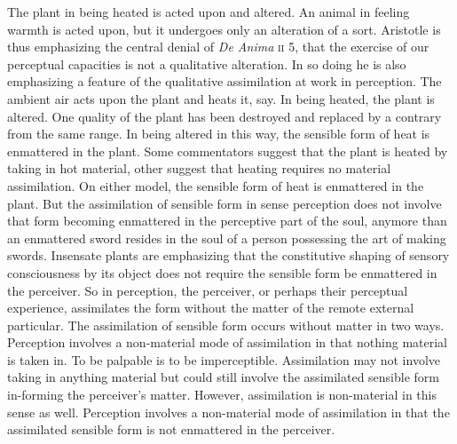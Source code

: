 The plant in being heated is acted upon and altered. An animal in feeling warmth is acted upon, but it undergoes only an alteration of a sort. Aristotle is thus emphasizing the central denial of \emph{De Anima} \textsc{ii} 5, that the exercise of our perceptual capacities is not a qualitative alteration. In so doing he is also emphasizing a feature of the qualitative assimilation at work in perception. The ambient air acts upon the plant and heats it, say. In being heated, the plant is altered. One quality of the plant has been destroyed and replaced by a contrary from the same range. In being altered in this way, the sensible form of heat is enmattered in the plant. Some commentators suggest that the plant is heated by taking in hot material, other suggest that heating requires no material assimilation. On either model, the sensible form of heat is enmattered in the plant. But the assimilation of sensible form in sense perception does not involve that form becoming enmattered in the perceptive part of the soul, anymore than an enmattered sword resides in the soul of a person possessing the art of making swords. Insensate plants are emphasizing that the constitutive shaping of sensory consciousness by its object does not require the sensible form be enmattered in the perceiver. So in perception, the perceiver, or perhaps their perceptual experience, assimilates the form without the matter of the remote external particular. The assimilation of sensible form occurs without matter in two ways. Perception involves a non-material mode of assimilation in that nothing material is taken in. To be palpable is to be imperceptible. Assimilation may not involve taking in anything material but could still involve the assimilated sensible form in-forming the perceiver's matter. However, assimilation is non-material in this sense as well. Perception involves a non-material mode of assimilation in that the assimilated sensible form is not enmattered in the perceiver.


